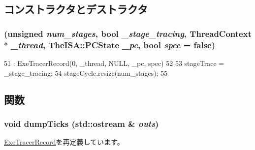 \subsection{コンストラクタとデストラクタ}
\hypertarget{classTrace_1_1InOrderTraceRecord_a869cff44b5a42c086d284b9e2c3afeda}{
\subsubsection[{InOrderTraceRecord}]{ (unsigned {\em num\_\-stages}, \/  bool {\em \_\-stage\_\-tracing}, \/  {\bf ThreadContext} $\ast$ {\em \_\-thread}, \/  TheISA::PCState {\em \_\-pc}, \/  bool {\em spec} = {\ttfamily false})}}
\label{classTrace_1_1InOrderTraceRecord_a869cff44b5a42c086d284b9e2c3afeda}



\begin{DoxyCode}
51         : ExeTracerRecord(0, _thread, NULL, _pc, spec)
52     {
53         stageTrace = _stage_tracing;
54         stageCycle.resize(num_stages);
55     }
\end{DoxyCode}


\subsection{関数}
\hypertarget{classTrace_1_1InOrderTraceRecord_afadde33f39e50889354f68ca4296a2ff}{
\subsubsection[{dumpTicks}]{\setlength{\rightskip}{0pt plus 5cm}void dumpTicks (std::ostream \& {\em outs})}}
\label{classTrace_1_1InOrderTraceRecord_afadde33f39e50889354f68ca4296a2ff}


\hyperlink{classTrace_1_1ExeTracerRecord_aef89645ab69fe4a5a6d76dd3439ad417}{ExeTracerRecord}を再定義しています。


